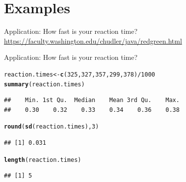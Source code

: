 \documentclass[10pt,handout]{beamer}\usepackage[]{graphicx}\usepackage[]{color}
\makeatletter
\newcommand{\hlnum}[1]{\textcolor[rgb]{0.686,0.059,0.569}{#1}}%
\newcommand{\hlopt}[1]{\textcolor[rgb]{0,0,0}{#1}}%
\newcommand{\hlstd}[1]{\textcolor[rgb]{0.345,0.345,0.345}{#1}}%
\newcommand{\hlkwb}[1]{\textcolor[rgb]{0.69,0.353,0.396}{#1}}%
\newcommand{\hlkwd}[1]{\textcolor[rgb]{0.737,0.353,0.396}{\textbf{#1}}}%
\newenvironment{kframe}{%
 \def\at@end@of@kframe{}%
 \ifinner\ifhmode%
  \def\at@end@of@kframe{\end{minipage}}%
  \begin{minipage}{\columnwidth}%
 \fi\fi%
 \def\FrameCommand##1{\hskip\@totalleftmargin \hskip-\fboxsep
 \colorbox{shadecolor}{##1}\hskip-\fboxsep
     \hskip-\linewidth \hskip-\@totalleftmargin \hskip\columnwidth}%
 \MakeFramed {\advance\hsize-\width
   \@totalleftmargin\z@ \linewidth\hsize
   \@setminipage}}%
 {\par\unskip\endMakeFramed%
 \at@end@of@kframe}
\newenvironment{knitrout}{}{} %
\makeatother
\begin{document}
\section{Examples}


\begin{frame}{Application: How fast is your reaction time?}
	\small\url{https://faculty.washington.edu/chudler/java/redgreen.html} 
	
	
\end{frame}


\begin{frame}[fragile]{Application: How fast is your reaction time?}
\begin{knitrout}\tiny
{}\color{fgcolor}\begin{kframe}
\begin{alltt}
\hlstd{reaction.times} \hlkwb{<-} \hlkwd{c}\hlstd{(}\hlnum{325}\hlstd{,}\hlnum{327}\hlstd{,}\hlnum{357}\hlstd{,}\hlnum{299}\hlstd{,}\hlnum{378}\hlstd{)}\hlopt{/}\hlnum{1000}
\hlkwd{summary}\hlstd{(reaction.times)}
\end{alltt}
\begin{verbatim}
##    Min. 1st Qu.  Median    Mean 3rd Qu.    Max. 
##    0.30    0.32    0.33    0.34    0.36    0.38
\end{verbatim}
\begin{alltt}
\hlkwd{round}\hlstd{(}\hlkwd{sd}\hlstd{(reaction.times),}\hlnum{3}\hlstd{)}
\end{alltt}
\begin{verbatim}
## [1] 0.031
\end{verbatim}
\begin{alltt}
\hlkwd{length}\hlstd{(reaction.times)}
\end{alltt}
\begin{verbatim}
## [1] 5
\end{verbatim}
\end{kframe}
\end{knitrout}
	
\end{frame}
\end{document}
